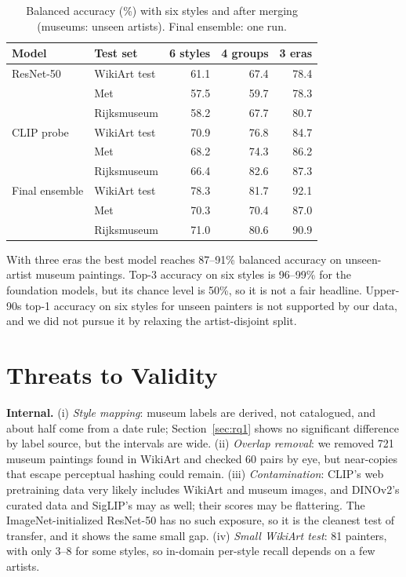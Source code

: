 \documentclass[conference]{IEEEtran}
\begin{document}
\begin{table}[t]
\centering
\caption{Balanced accuracy (\%) with six styles and after merging (museums: unseen artists). Final ensemble: one run.}
\label{tab:merged}
\setlength{\tabcolsep}{3pt}
\begin{tabular}{llrrr}
\toprule
Model & Test set & 6 styles & 4 groups & 3 eras \\
\midrule
ResNet-50 & WikiArt test & 61.1 & 67.4 & 78.4 \\
 & Met & 57.5 & 59.7 & 78.3 \\
 & Rijksmuseum & 58.2 & 67.7 & 80.7 \\
\midrule
CLIP probe & WikiArt test & 70.9 & 76.8 & 84.7 \\
 & Met & 68.2 & 74.3 & 86.2 \\
 & Rijksmuseum & 66.4 & 82.6 & 87.3 \\
\midrule
Final ensemble & WikiArt test & 78.3 & 81.7 & 92.1 \\
 & Met & 70.3 & 70.4 & 87.0 \\
 & Rijksmuseum & 71.0 & 80.6 & 90.9 \\
\bottomrule
\end{tabular}
\end{table}

With three eras the best model reaches 87--91\% balanced accuracy on unseen-artist museum paintings. Top-3 accuracy on six styles is 96--99\% for the foundation models, but its chance level is 50\%, so it is not a fair headline. Upper-90s top-1 accuracy on six styles for unseen painters is not supported by our data, and we did not pursue it by relaxing the artist-disjoint split.

\section{Threats to Validity}
\label{sec:threats}

\textbf{Internal.} (i) \emph{Style mapping}: museum labels are derived, not catalogued, and about half come from a date rule; Section~\ref{sec:rq1} shows no significant difference by label source, but the intervals are wide. (ii) \emph{Overlap removal}: we removed 721 museum paintings found in WikiArt and checked 60 pairs by eye, but near-copies that escape perceptual hashing could remain. (iii) \emph{Contamination}: CLIP's web pretraining data very likely includes WikiArt and museum images, and DINOv2's curated data and SigLIP's may as well; their scores may be flattering. The ImageNet-initialized ResNet-50 has no such exposure, so it is the cleanest test of transfer, and it shows the same small gap. (iv) \emph{Small WikiArt test}: 81 painters, with only 3--8 for some styles, so in-domain per-style recall depends on a few artists.
\end{document}
